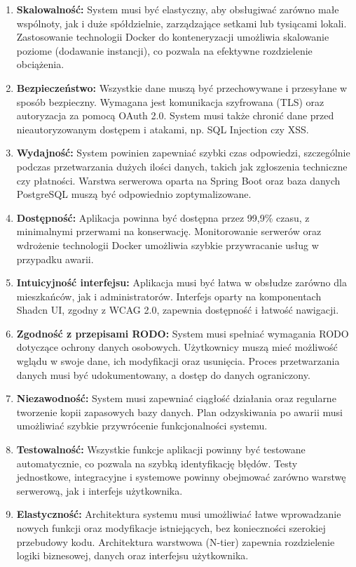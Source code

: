 \begin{enumerate}[label=\arabic*.]

   \item \textbf{Skalowalność:} System musi być elastyczny, aby obsługiwać zarówno małe wspólnoty, jak i duże spółdzielnie, zarządzające setkami lub tysiącami lokali. Zastosowanie technologii Docker do konteneryzacji umożliwia skalowanie poziome (dodawanie instancji), co pozwala na efektywne rozdzielenie obciążenia.

	\item \textbf{Bezpieczeństwo:} Wszystkie dane muszą być przechowywane i przesyłane w sposób bezpieczny. Wymagana jest komunikacja szyfrowana (TLS) oraz autoryzacja za pomocą OAuth 2.0. System musi także chronić dane przed nieautoryzowanym dostępem i atakami, np. SQL Injection czy XSS.

	\item \textbf{Wydajność:} System powinien zapewniać szybki czas odpowiedzi, szczególnie podczas przetwarzania dużych ilości danych, takich jak zgłoszenia techniczne czy płatności. Warstwa serwerowa oparta na Spring Boot oraz baza danych PostgreSQL muszą być odpowiednio zoptymalizowane.

	\item \textbf{Dostępność:} Aplikacja powinna być dostępna przez 99,9\% czasu, z minimalnymi przerwami na konserwację. Monitorowanie serwerów oraz wdrożenie technologii Docker umożliwia szybkie przywracanie usług w przypadku awarii.

	\item \textbf{Intuicyjność interfejsu:} Aplikacja musi być łatwa w obsłudze zarówno dla mieszkańców, jak i administratorów. Interfejs oparty na komponentach Shadcn UI, zgodny z WCAG 2.0, zapewnia dostępność i łatwość nawigacji.

	\item \textbf{Zgodność z przepisami RODO:} System musi spełniać wymagania RODO dotyczące ochrony danych osobowych. Użytkownicy muszą mieć możliwość wglądu w swoje dane, ich modyfikacji oraz usunięcia. Proces przetwarzania danych musi być udokumentowany, a dostęp do danych ograniczony.

	\item \textbf{Niezawodność:} System musi zapewniać ciągłość działania oraz regularne tworzenie kopii zapasowych bazy danych. Plan odzyskiwania po awarii musi umożliwiać szybkie przywrócenie funkcjonalności systemu.

	\item \textbf{Testowalność:} Wszystkie funkcje aplikacji powinny być testowane automatycznie, co pozwala na szybką identyfikację błędów. Testy jednostkowe, integracyjne i systemowe powinny obejmować zarówno warstwę serwerową, jak i interfejs użytkownika.

	\item \textbf{Elastyczność:} Architektura systemu musi umożliwiać łatwe wprowadzanie nowych funkcji oraz modyfikacje istniejących, bez konieczności szerokiej przebudowy kodu. Architektura warstwowa (N-tier) zapewnia rozdzielenie logiki biznesowej, danych oraz interfejsu użytkownika.

\end{enumerate}

